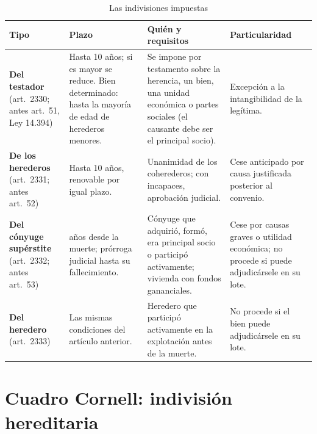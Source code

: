 \documentclass[12pt,oneside]{book}
\begin{document}
\begin{table}[H]
\centering
\caption{Las indivisiones impuestas}
\footnotesize
\begin{tabularx}{\textwidth}{@{}>{\raggedright\arraybackslash}p{2.4cm}>{\raggedright\arraybackslash}X>{\raggedright\arraybackslash}X>{\raggedright\arraybackslash}X@{}}
\toprule
\textbf{Tipo} & \textbf{Plazo} & \textbf{Quién y requisitos} & \textbf{Particularidad} \\
\midrule
\textbf{Del testador} (art.~2330; antes art.~51, Ley 14.394) & Hasta 10 años; si es mayor se reduce. Bien determinado: hasta la mayoría de edad de herederos menores. & Se impone por testamento sobre la herencia, un bien, una unidad económica o partes sociales (el causante debe ser el principal socio). & Excepción a la intangibilidad de la legítima. \\
\addlinespace
\textbf{De los herederos} (art.~2331; antes art.~52) & Hasta 10 años, renovable por igual plazo. & Unanimidad de los coherederos; con incapaces, aprobación judicial. & Cese anticipado por causa justificada posterior al convenio. \\
\addlinespace
\textbf{Del cónyuge supérstite} (art.~2332; antes art.~53) & 10 años desde la muerte; prórroga judicial hasta su fallecimiento. & Cónyuge que adquirió, formó, era principal socio o participó activamente; vivienda con fondos gananciales. & Cese por causas graves o utilidad económica; no procede si puede adjudicársele en su lote. \\
\addlinespace
\textbf{Del heredero} (art.~2333) & Las mismas condiciones del artículo anterior. & Heredero que participó activamente en la explotación antes de la muerte. & No procede si el bien puede adjudicársele en su lote. \\
\bottomrule
\end{tabularx}
\end{table}

\section{Cuadro Cornell: indivisión hereditaria}
\end{document}
